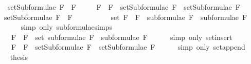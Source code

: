 \begin{isabellebody}
\ \ {\isachardoublequoteopen}setSubformulae\ {\isacharparenleft}F{}\ \isactrlbold {\isasymand}\ F{}{\isacharparenright}\ \isanewline
\ \ \ {\isacharequal}\ {\isacharbraceleft}F{}\ \isactrlbold {\isasymand}\ F{}{\isacharbraceright}\ {\isasymunion}\ {\isacharparenleft}setSubformulae\ F{}\ {\isasymunion}\ setSubformulae\ F{}{\isacharparenright}{\isachardoublequoteclose}\isanewline
%
\isadelimproof
%
\endisadelimproof
%
\isatagproof
{}\isamarkupfalse%
\ {\isacharminus}\isanewline
\ \ \isamarkupfalse%
\ {\isachardoublequoteopen}setSubformulae\ {\isacharparenleft}F{}\ \isactrlbold {\isasymand}\ F{}{\isacharparenright}\ \isanewline
\ \ \ \ \ \ \ \ {\isacharequal}\ set\ {\isacharparenleft}{\isacharparenleft}F{}\ \isactrlbold {\isasymand}\ F{}{\isacharparenright}\ {\isacharhash}\ {\isacharparenleft}subformulae\ F{}\ {\isacharat}\ subformulae\ F{}{\isacharparenright}{\isacharparenright}{\isachardoublequoteclose}\isanewline
\ \ \ \ \isamarkupfalse%
\ {\isacharparenleft}simp\ only{\isacharcolon}\ subformulae{\isachardot}simps{\isacharparenleft}{}{\isacharparenright}{\isacharparenright}\isanewline
\ \ \isamarkupfalse%
\ \isamarkupfalse%
\ {\isachardoublequoteopen}{\isasymdots}\ {\isacharequal}\ {\isacharbraceleft}F{}\ \isactrlbold {\isasymand}\ F{}{\isacharbraceright}\ {\isasymunion}\ {\isacharparenleft}set\ {\isacharparenleft}subformulae\ F{}\ {\isacharat}\ subformulae\ F{}{\isacharparenright}{\isacharparenright}{\isachardoublequoteclose}\isanewline
\ \ \ \ \isamarkupfalse%
\ {\isacharparenleft}simp\ only{\isacharcolon}\ set{\isacharunderscore}insert{\isacharparenright}\isanewline
\ \ \isamarkupfalse%
\ \isamarkupfalse%
\ {\isachardoublequoteopen}{\isasymdots}\ {\isacharequal}\ {\isacharbraceleft}F{}\ \isactrlbold {\isasymand}\ F{}{\isacharbraceright}\ {\isasymunion}\ {\isacharparenleft}setSubformulae\ F{}\ {\isasymunion}\ setSubformulae\ F{}{\isacharparenright}{\isachardoublequoteclose}\isanewline
\ \ \ \ \isamarkupfalse%
\ {\isacharparenleft}simp\ only{\isacharcolon}\ set{\isacharunderscore}append{\isacharparenright}\isanewline
\ \ \isamarkupfalse%
\ \isamarkupfalse%
\ {\isacharquery}thesis\isanewline
\ \ \ \ \isamarkupfalse%

\end{isabellebody}
